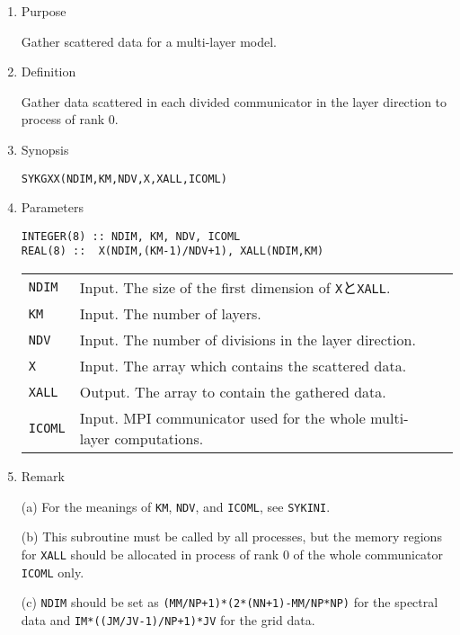 \documentclass[a4paper]{scrartcl}
\begin{document}
\begin{enumerate}

\item Purpose 

Gather scattered data for a multi-layer model.

\item Definition

  Gather data scattered in each divided communicator in the layer direction
  to process of rank 0.    

\item Synopsis 

\texttt{SYKGXX(NDIM,KM,NDV,X,XALL,ICOML)}
  
\item Parameters

\begin{verbatim}        
INTEGER(8) :: NDIM, KM, NDV, ICOML
REAL(8) ::  X(NDIM,(KM-1)/NDV+1), XALL(NDIM,KM)
\end{verbatim}

\begin{tabular}{lll}
\texttt{NDIM} & Input. The size of the first dimension of
\texttt{X}と\texttt{XALL}.\\
\texttt{KM} & Input. The number of layers.\\
\texttt{NDV} & Input. The number of divisions in the layer direction.\\  
\texttt{X} & Input. The array which contains the scattered data.\\
\texttt{XALL} & Output.
The array to contain the gathered data.\\
\texttt{ICOML} & Input. MPI communicator used for the whole
multi-layer computations.
\end{tabular}

\item Remark

  (a) For the meanings of
  \texttt{KM}, \texttt{NDV}, and \texttt{ICOML}, see
  \texttt{SYKINI}.

(b) This subroutine must be called by all processes, but
the memory regions for \texttt{XALL}
should be allocated in process of rank 0 of
the whole communicator \texttt{ICOML} only.

(c) \texttt{NDIM} should be set as
\texttt{(MM/NP+1)*(2*(NN+1)-MM/NP*NP)} for the
spectral data and
\texttt{IM*((JM/JV-1)/NP+1)*JV} for the grid data.

\end{enumerate}

\end{document}
